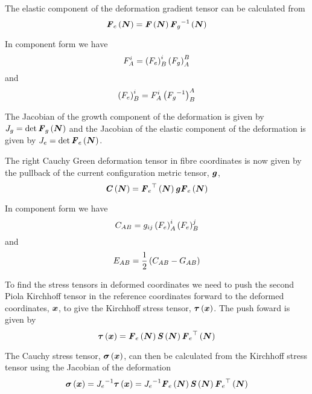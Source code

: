 The elastic component of the deformation gradient tensor can be calculated
from
\begin{equation}
   \boldsymbol{\mathit{F}}_{e}\left( \boldsymbol{N} \right) = \boldsymbol{\mathit{F}}\left( \boldsymbol{N} \right)  {\boldsymbol{\mathit{F}}_{g}}^{-1}\left( \boldsymbol{N} \right) 
\end{equation}

In component form we have
\begin{equation}
  F^{i}_{A}=\left( F_{e} \right)^{i}_{B}\left( F_{g} \right)^{B}_{A}
\end{equation}
and
\begin{equation}
  \left( F_{e} \right)^{i}_{B}=F^{i}_{A}\left( {F_{g}}^{-1} \right)^{A}_{B}
\end{equation}

The Jacobian of the growth component of the deformation is given by
$J_{g}=\det  \boldsymbol{\mathit{F}}_{g}\left( \boldsymbol{N} \right) $ and the Jacobian of the
elastic component of the deformation is given by
$J_{e}=\det  \boldsymbol{\mathit{F}}_{e}\left( \boldsymbol{N} \right) $.

The right Cauchy Green deformation tensor in fibre coordinates is now given by
the pullback of the current configuration metric tensor, $\boldsymbol{\mathit{g}}$,
\begin{equation}
   \boldsymbol{\mathit{C}}\left( \boldsymbol{N} \right) =  {\boldsymbol{\mathit{F}}_{e}}^{ \top } \left( \boldsymbol{N} \right) \boldsymbol{\mathit{g}} \boldsymbol{\mathit{F}}_{e}\left( \boldsymbol{N} \right) 
\end{equation}

In component form we have
\begin{equation}
  C_{AB}=g_{ij}\left( F_{e} \right)^{i}_{A}\left( F_{e} \right)^{j}_{B}
\end{equation}
and
\begin{equation}
  E_{AB}=\frac{1}{2}\left( C_{AB}-G_{AB} \right)
\end{equation}

To find the stress tensors in deformed coordinates we need to push the second
Piola Kirchhoff tensor in the reference coordinates forward to the deformed
coordinates, $\boldsymbol{x}$, to give the Kirchhoff stress tensor,
$ \boldsymbol{\mathit{\tau}}\left( \boldsymbol{x} \right) $. The push foward is given by
\begin{equation}
   \boldsymbol{\mathit{\tau}}\left( \boldsymbol{x} \right) = \boldsymbol{\mathit{F}}_{e}\left( \boldsymbol{N} \right)  \boldsymbol{\mathit{S}}\left( \boldsymbol{N} \right) 
    {\boldsymbol{\mathit{F}}_{e}}^{ \top } \left( \boldsymbol{N} \right) 
\end{equation}

The Cauchy stress tensor, $ \boldsymbol{\mathit{\sigma}}\left( \boldsymbol{x} \right) $, can then be calculated from the Kirchhoff stress
tensor using the Jacobian of the deformation \ie
\begin{equation}
   \boldsymbol{\mathit{\sigma}}\left( \boldsymbol{x} \right) ={J_{e}}^{-1} \boldsymbol{\mathit{\tau}}\left( \boldsymbol{x} \right) ={J_{e}}^{-1}
   \boldsymbol{\mathit{F}}_{e}\left( \boldsymbol{N} \right)  \boldsymbol{\mathit{S}}\left( \boldsymbol{N} \right)   {\boldsymbol{\mathit{F}}_{e}}^{ \top } \left( \boldsymbol{N} \right) 
\end{equation}

